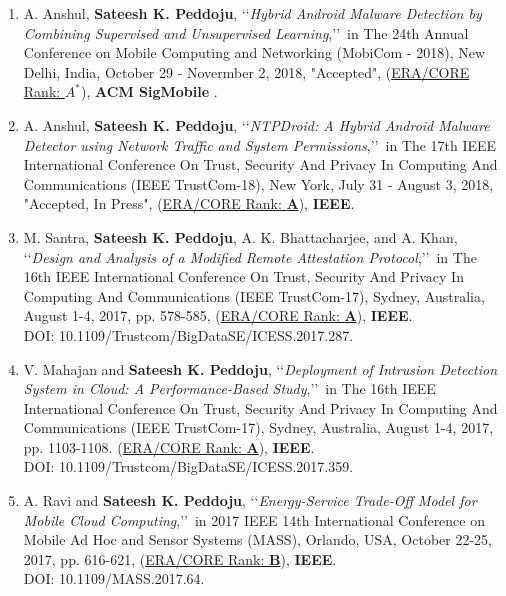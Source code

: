 \begin{enumerate}%

		\item
	A. Anshul, \textbf{Sateesh K. Peddoju}, \lq\lq \textit{Hybrid Android Malware Detection by Combining Supervised and Unsupervised Learning},\rq\rq\, in The 24th Annual Conference on Mobile Computing and Networking (MobiCom - 2018), New Delhi, India, October 29 - Novermber 2, 2018, "Accepted", (\underline{ERA/CORE Rank: \textbf{$A^*$}}), \textbf{ACM SigMobile} .
	
	\item
	A. Anshul, \textbf{Sateesh K. Peddoju}, \lq\lq \textit{NTPDroid: A Hybrid Android Malware Detector using Network Traffic and System Permissions},\rq\rq\, in The 17th IEEE International Conference On Trust, Security And Privacy In Computing And Communications (IEEE TrustCom-18), New York, July 31 - August 3, 2018, "Accepted, In Press", (\underline{ERA/CORE Rank: \textbf{A}}), \textbf{IEEE}.
	
	\item
	M. Santra, \textbf{Sateesh K. Peddoju}, A. K. Bhattacharjee, and A. Khan, \lq\lq \textit{Design and Analysis of a Modified Remote Attestation Protocol},\rq\rq\, in The 16th IEEE International Conference On Trust, Security And Privacy In Computing And Communications (IEEE TrustCom-17), Sydney, Australia, August 1-4, 2017, pp. 578-585, (\underline{ERA/CORE Rank: \textbf{A}}), \textbf{IEEE}. \\DOI: 10.1109/Trustcom/BigDataSE/ICESS.2017.287.	
		
	\item
	V. Mahajan and \textbf{Sateesh K. Peddoju}, \lq\lq \textit{Deployment of Intrusion Detection System in Cloud: A Performance-Based Study},\rq\rq\,  in The 16th IEEE International Conference On Trust, Security And Privacy In Computing And Communications (IEEE TrustCom-17), Sydney, Australia, August 1-4, 2017, pp. 1103-1108. (\underline{ERA/CORE Rank: \textbf{A}}), \textbf{IEEE}. \\ DOI: 10.1109/Trustcom/BigDataSE/ICESS.2017.359.
	
	\item
	A. Ravi and \textbf{Sateesh K. Peddoju}, \lq\lq \textit{Energy-Service Trade-Off Model for Mobile Cloud Computing},\rq\rq\, in 2017 IEEE 14th International Conference on Mobile Ad Hoc and Sensor Systems (MASS), Orlando, USA, October 22-25, 2017, pp. 616-621, (\underline{ERA/CORE Rank: \textbf{B}}), \textbf{IEEE}. \\DOI: 10.1109/MASS.2017.64.
	

\end{enumerate}
